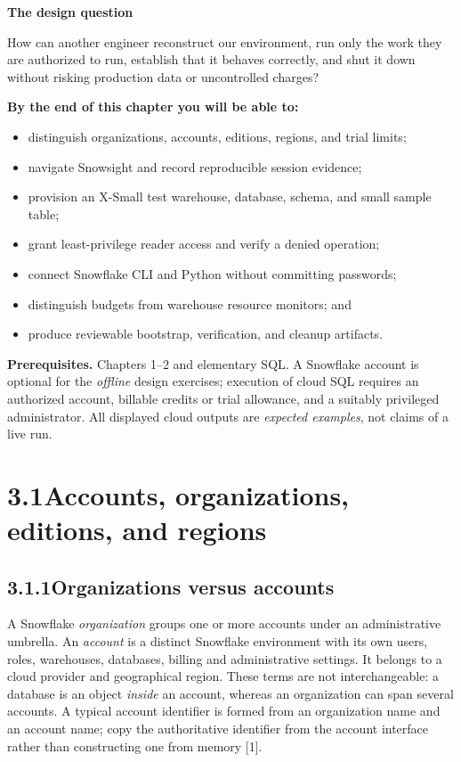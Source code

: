 \documentclass[11pt,twoside]{article}
\newcommand{\topic}[2]{\subsection*{#1\quad #2}}
\begin{document}
\begin{insight}
\textbf{The design question}\par
How can another engineer reconstruct our environment, run only the work they are authorized to run, establish that it behaves correctly, and shut it down without risking production data or uncontrolled charges?
\end{insight}
\textbf{By the end of this chapter you will be able to:}
\begin{itemize}
\item distinguish organizations, accounts, editions, regions, and trial limits;
\item navigate Snowsight and record reproducible session evidence;
\item provision an X-Small test warehouse, database, schema, and small sample table;
\item grant least-privilege reader access and verify a denied operation;
\item connect Snowflake CLI and Python without committing passwords;
\item distinguish budgets from warehouse resource monitors; and
\item produce reviewable bootstrap, verification, and cleanup artifacts.
\end{itemize}
\textbf{Prerequisites.} Chapters 1--2 and elementary SQL. A Snowflake account is optional for the \emph{offline} design exercises; execution of cloud SQL requires an authorized account, billable credits or trial allowance, and a suitably privileged administrator. All displayed cloud outputs are \emph{expected examples}, not claims of a live run.

\newpage
\section*{3.1\quad Accounts, organizations, editions, and regions}
\topic{3.1.1}{Organizations versus accounts}
A Snowflake \emph{organization} groups one or more accounts under an administrative umbrella. An \emph{account} is a distinct Snowflake environment with its own users, roles, warehouses, databases, billing and administrative settings. It belongs to a cloud provider and geographical region. These terms are not interchangeable: a database is an object \emph{inside} an account, whereas an organization can span several accounts. A typical account identifier is formed from an organization name and an account name; copy the authoritative identifier from the account interface rather than constructing one from memory [1].
\end{document}

